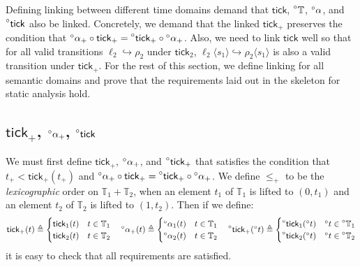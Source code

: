 \documentclass[acmsmall,screen,review]{acmart}\settopmatter{printfolios=true,printccs=false,printacmref=false}
\newcommand*{\A}[1]{\prescript{\circ}{}{#1}}
\newcommand*{\Time}{\mathbb{T}}
\newcommand*{\semarrow}{\hookrightarrow}
\newcommand*{\tick}{\mathsf{tick}}
\newcommand*{\inject}[2]{{#2}\langle{#1}\rangle}
\begin{document}
Defining linking between different time domains demand that $\tick$, $\A\Time$, $\A\alpha$, and $\A\tick$ also be linked.
Concretely, we demand that the linked $\tick_+$ preserves the condition that $\A\alpha_+\circ\tick_+=\A\tick_+\circ\A\alpha_+$.
Also, we need to link $\tick$ well so that for all valid transitions $\ell_2\semarrow\rho_2$ under $\tick_2$, $\inject{s_1}{\ell_2}\semarrow\inject{s_1}{\rho_2}$ is also a valid transition under $\tick_+$.
For the rest of this section, we define linking for all semantic domains and prove that the requirements laid out in the skeleton for static analysis hold.

\subsection{$\tick_+$, $\A\alpha_+$, $\A\tick$}
We must first define $\tick_+$, $\A\alpha_+$, and $\A\tick_+$ that satisfies the condition that $t_+<\tick_+(t_+)$ and $\A\alpha_+\circ\tick_+=\A\tick_+\circ\A\alpha_+$.
We define $\le_+$ to be the \emph{lexicographic} order on $\Time_1+\Time_2$, when an element $t_1$ of $\Time_1$ is lifted to $(0,t_1)$ and an element $t_2$ of $\Time_2$ is lifted to $(1,t_2)$.
Then if we define:
\[
  \tick_+(t)\triangleq
  \begin{cases}
    \tick_1(t) & t\in\Time_1 \\
    \tick_2(t) & t\in\Time_2
  \end{cases}\quad
  \A\alpha_+(t)\triangleq
  \begin{cases}
    \A\alpha_1(t) & t\in\Time_1 \\
    \A\alpha_2(t) & t\in\Time_2
  \end{cases}\quad
  \A\tick_+(\A{t})\triangleq
  \begin{cases}
    \A\tick_1(\A{t}) & \A{t}\in\A\Time_1 \\
    \A\tick_2(\A{t}) & \A{t}\in\A\Time_2
  \end{cases}
\]
it is easy to check that all requirements are satisfied.
\end{document}
